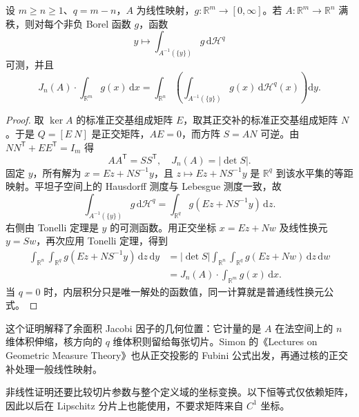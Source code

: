 \begin{theorem}[线性余面积公式]
\label{b1:thm:linear-coarea-formula}
设 \(m\ge n\ge1\)、\(q=m-n\)，\(A\) 为线性映射，\(g:\mathbb R^m\to[0,\infty]\)。若 \(A:\mathbb R^m\rightarrow\mathbb R^n\) 满秩，则对每个非负 Borel 函数 \(g\)，函数
\[
 y\longmapsto\int_{A^{-1}(\{y\})}g\,\mathrm{d}\mathcal H^q
\]
可测，并且
\[
 J_n(A)\cdot\int_{\mathbb R^m}g(x)\,\mathrm{d}x
 =\int_{\mathbb R^n}\left(
   \int_{A^{-1}(\{y\})}g(x)\,\mathrm{d}\mathcal H^q(x)
 \right)\mathrm{d}y.
\]
\end{theorem}
\begin{proof}
取 \(\ker A\) 的标准正交基组成矩阵 \(E\)，取其正交补的标准正交基组成矩阵 \(N\)。于是 \(Q=[E\ N]\) 是正交矩阵，\(AE=0\)，而方阵 \(S=AN\) 可逆。由 \(NN^{\mathsf T}+EE^{\mathsf T}=I_m\) 得
\[
 AA^{\mathsf T}=SS^{\mathsf T},\quad J_n(A)=|\det S|.
\]
固定 \(y\)，所有解为 \(x=Ez+NS^{-1}y\)，且 \(z\mapsto Ez+NS^{-1}y\) 是 \(\mathbb R^q\) 到该水平集的等距映射。平坦子空间上的 Hausdorff 测度与 Lebesgue 测度一致，故
\[
 \int_{A^{-1}(\{y\})}g\,\mathrm{d}\mathcal H^q
 =\int_{\mathbb R^q}g(Ez+NS^{-1}y)\,\mathrm{d}z.
\]
右侧由 Tonelli 定理是 \(y\) 的可测函数。用正交坐标 \(x=Ez+Nw\) 及线性换元 \(y=Sw\)，再次应用 Tonelli 定理，得到
\[
 \begin{aligned}
 \int_{\mathbb R^n}\int_{\mathbb R^q}g(Ez+NS^{-1}y)\,\mathrm{d}z\,\mathrm{d}y
 &=|\det S|\int_{\mathbb R^n}\int_{\mathbb R^q}g(Ez+Nw)\,\mathrm{d}z\,\mathrm{d}w\\
 &=J_n(A)\cdot\int_{\mathbb R^m}g(x)\,\mathrm{d}x.
 \end{aligned}
\]
当 \(q=0\) 时，内层积分只是唯一解处的函数值，同一计算就是普通线性换元公式。
\end{proof}

这个证明解释了余面积 Jacobi 因子的几何位置：它计量的是 \(A\) 在法空间上的 \(n\) 维体积伸缩，核方向的 \(q\) 维体积则留给每张切片。Simon 的《Lectures on Geometric Measure Theory》\cite[\S10, 10.1--10.2]{Simon1983Lectures}也从正交投影的 Fubini 公式出发，再通过核的正交补处理一般线性映射。

\ProseParagraphBreak

非线性证明还要比较切片参数与整个定义域的坐标变换。以下恒等式仅依赖矩阵，因此以后在 Lipschitz 分片上也能使用，不要求矩阵来自 \(C^1\) 坐标。

